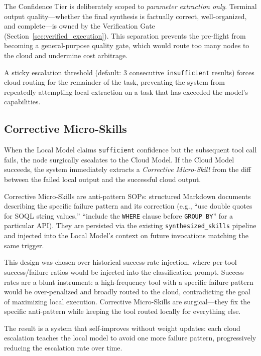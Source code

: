 \documentclass{article}
\begin{document}
The Confidence Tier is deliberately scoped to \emph{parameter extraction only}.
Terminal output quality---whether the final synthesis is factually correct, well-organized, and complete---is owned by the Verification Gate (Section~\ref{sec:verified_execution}).
This separation prevents the pre-flight from becoming a general-purpose quality gate, which would route too many nodes to the cloud and undermine cost arbitrage.

A sticky escalation threshold (default: 3 consecutive \texttt{insufficient} results) forces cloud routing for the remainder of the task, preventing the system from repeatedly attempting local extraction on a task that has exceeded the model's capabilities.

\subsection{Corrective Micro-Skills}
\label{sec:corrective_skills}

When the Local Model claims \texttt{sufficient} confidence but the subsequent tool call fails, the node surgically escalates to the Cloud Model.
If the Cloud Model succeeds, the system immediately extracts a \emph{Corrective Micro-Skill} from the diff between the failed local output and the successful cloud output.

Corrective Micro-Skills are anti-pattern SOPs: structured Markdown documents describing the specific failure pattern and its correction (e.g., ``use double quotes for SOQL string values,'' ``include the \texttt{WHERE} clause before \texttt{GROUP BY}'' for a particular API).
They are persisted via the existing \texttt{synthesized\_skills} pipeline and injected into the Local Model's context on future invocations matching the same trigger.

This design was chosen over historical success-rate injection, where per-tool success/failure ratios would be injected into the classification prompt.
Success rates are a blunt instrument: a high-frequency tool with a specific failure pattern would be over-penalized and broadly routed to the cloud, contradicting the goal of maximizing local execution.
Corrective Micro-Skills are surgical---they fix the specific anti-pattern while keeping the tool routed locally for everything else.

The result is a system that self-improves without weight updates: each cloud escalation teaches the local model to avoid one more failure pattern, progressively reducing the escalation rate over time.
\end{document}
